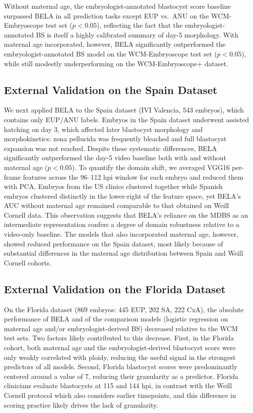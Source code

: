 \documentclass[11pt,a4paper]{article}
\begin{document}
Without maternal age, the embryologist-annotated blastocyst score baseline
surpassed BELA in all prediction tasks except EUP vs.\ ANU on the
WCM-Embryoscope test set ($p < 0.05$), reflecting the fact that the
embryologist-annotated BS is itself a highly calibrated summary of day-5
morphology. With maternal age incorporated, however, BELA significantly
outperformed the embryologist-annotated BS model on the WCM-Embryoscope
test set ($p < 0.05$), while still modestly underperforming on the
WCM-Embryoscope+ dataset.

\subsection{External Validation on the Spain Dataset}

We next applied BELA to the Spain dataset (IVI Valencia, 543 embryos),
which contains only EUP/ANU labels. Embryos in the Spain dataset
underwent assisted hatching on day 3, which affected later blastocyst
morphology and morphokinetics: zona pellucida was frequently bleached and
full blastocyst expansion was not reached. Despite these systematic
differences, BELA significantly outperformed the day-5 video baseline
both with and without maternal age ($p < 0.05$). To quantify the
domain shift, we averaged VGG16 per-frame features across the 96--112 hpi
window for each embryo and reduced them with PCA. Embryos from the US
clinics clustered together while Spanish embryos clustered distinctly in
the lower-right of the feature space, yet BELA's AUC without maternal
age remained comparable to that obtained on Weill Cornell data. This
observation suggests that BELA's reliance on the MDBS as an intermediate
representation confers a degree of domain robustness relative to a
video-only baseline. The models that also incorporated maternal age,
however, showed reduced performance on the Spain dataset, most likely
because of substantial differences in the maternal age distribution
between Spain and Weill Cornell cohorts.

\subsection{External Validation on the Florida Dataset}

On the Florida dataset (869 embryos: 445 EUP, 202 SA, 222 CxA), the
absolute performance of BELA and of the comparison models (logistic
regression on maternal age and/or embryologist-derived BS) decreased
relative to the WCM test sets. Two factors likely contributed to this
decrease. First, in the Florida cohort, both maternal age and the
embryologist-derived blastocyst score were only weakly correlated with
ploidy, reducing the useful signal in the strongest predictors of all
models. Second, Florida blastocyst scores were predominantly centered
around a value of 7, reducing their granularity as a predictor. Florida
clinicians evaluate blastocysts at 115 and 144 hpi, in contrast with the
Weill Cornell protocol which also considers earlier timepoints, and this
difference in scoring practice likely drives the lack of granularity.
\end{document}
